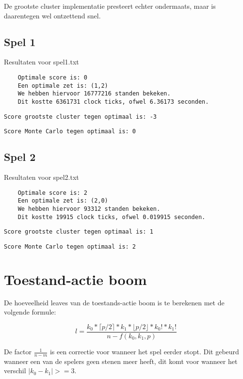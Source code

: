 \documentclass[10pt]{article}
\begin{document}
De grootste cluster implementatie presteert echter ondermaats, maar is daarentegen wel ontzettend snel.

\subsection{Spel 1}
Resultaten voor spel1.txt
\begin{lstlisting}
    Optimale score is: 0
    Een optimale zet is: (1,2)
    We hebben hiervoor 16777216 standen bekeken.
    Dit kostte 6361731 clock ticks, ofwel 6.36173 seconden.
\end{lstlisting}


\begin{lstlisting}
Score grootste cluster tegen optimaal is: -3
\end{lstlisting}

\begin{lstlisting}
Score Monte Carlo tegen optimaal is: 0
\end{lstlisting}

\subsection{Spel 2}
Resultaten voor spel2.txt
\begin{lstlisting}
    Optimale score is: 2
    Een optimale zet is: (2,0)
    We hebben hiervoor 93312 standen bekeken.
    Dit kostte 19915 clock ticks, ofwel 0.019915 seconden.
\end{lstlisting}


\begin{lstlisting}
Score grootste cluster tegen optimaal is: 1
\end{lstlisting}

\begin{lstlisting}
Score Monte Carlo tegen optimaal is: 2
\end{lstlisting}

\section{Toestand-actie boom}
De hoeveelheid leaves van de toestands-actie boom is te berekenen met de volgende formule:

\begin{equation}
    l = \frac{k_0 * \lceil p/2 \rceil * k_1 * \lfloor p/2 \rfloor * k_0! * k_1!}{n-f(k_0, k_1, p)} 
\end{equation}

De factor $\frac{1}{n - m}$ is een correctie voor wanneer het spel eerder stopt.
Dit gebeurd wanneer een van de spelers geen stenen meer heeft, dit komt voor wanneer het verschil $|k_0 -k_1| >= 3$.
\end{document}
